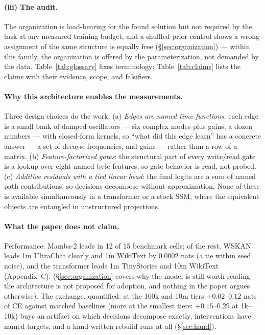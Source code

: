 \documentclass[11pt]{article}
\newcommand{\wskan}{WSKAN}
\begin{document}
\paragraph{(iii) The audit.} The organization is load-bearing for the
found solution but not required by the task at any measured training
budget, and a shuffled-prior control shows a wrong assignment of the same
structure is equally free (\S\ref{sec:organization}) --- within this
family, the organization
is offered by the parameterization, not demanded by the data.
Table~\ref{tab:glossary} fixes terminology; Table~\ref{tab:claims} lists
the claims with their evidence, scope, and falsifiers.

\paragraph{Why this architecture enables the measurements.}
Three design choices do the work. (a) \emph{Edges are named time
functions}: each edge is a small bank of damped oscillators --- six
complex modes plus gains, a dozen numbers --- with closed-form
kernels, so ``what did this edge learn'' has a concrete answer --- a set of
decays, frequencies, and gains --- rather than a row of a matrix. (b)
\emph{Feature-factorized gates}: the structural part of every write/read
gate is a lookup over eight named byte features, so gate behavior is read,
not probed. (c) \emph{Additive residuals with a tied linear head}: the
final logits are a sum of named path contributions, so decisions decompose
without approximation. None of these is available simultaneously in a
transformer or a stock SSM, where the equivalent objects are entangled in
unstructured projections.

\paragraph{What the paper does not claim.}
Performance: Mamba-2 leads in 12 of 15 benchmark cells; of the rest,
\wskan{} leads 1m UltraChat clearly and 1m WikiText by $0.0002$ nats (a
tie within seed noise), and the transformer leads 1m TinyStories and 10m
WikiText (Appendix~C).
(\S\ref{sec:organization} covers why the model is still worth reading ---
the architecture is not proposed for adoption, and nothing in the paper
argues otherwise). The exchange, quantified: at the 100k and 10m tiers
$+0.02$--$0.12$ nats of CE against matched baselines (more at the smallest
tiers: $+0.15$--$0.29$ at 1k--10k) buys an artifact on which decisions decompose
exactly, interventions have named targets, and a hand-written rebuild runs
at all (\S\ref{sec:hand}).
\end{document}

